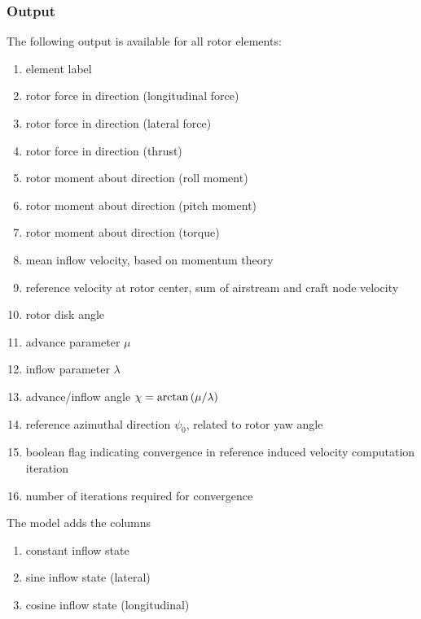 \subsubsection{Output}
The following output is available for all rotor elements:
\begin{enumerate}
\item element label
\item rotor force in  direction (longitudinal force)
\item rotor force in  direction (lateral force)
\item rotor force in  direction (thrust)
\item rotor moment about  direction (roll moment)
\item rotor moment about  direction (pitch moment)
\item rotor moment about  direction (torque)
\item mean inflow velocity, based on momentum theory
\item reference velocity at rotor center, sum of airstream
	and craft node velocity
\item rotor disk angle
\item advance parameter $\mu$
\item inflow parameter $\lambda$
\item advance/inflow angle $\chi=\arctan\left( \mu/\lambda \right)$
\item reference azimuthal direction $\psi_0$, related to rotor yaw angle
\item boolean flag indicating convergence in reference induced velocity
	computation iteration
\item number of iterations required for convergence
\setcounter{elem_rotor_output}{\value{enumi}}
\end{enumerate}
The  model adds the columns
\begin{enumerate}
\setcounter{enumi}{\value{elem_rotor_output}}
\item constant inflow state
\item sine inflow state (lateral)
\item cosine inflow state (longitudinal)
\end{enumerate}

